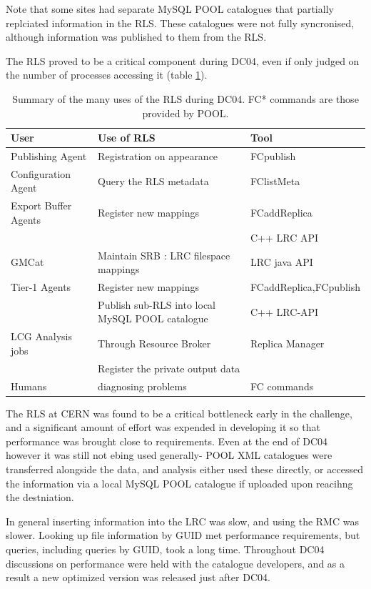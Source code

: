 \documentclass{cmspaper}
\begin{document}
Note that some sites had separate MySQL POOL catalogues that partially replciated information in the RLS. These catalogues were not fully syncronised, although information was published to them from the RLS.

The RLS proved to be a critical component during DC04, even if only judged on the number of processes accessing it (table \ref{table:rls}).

\begin{table}
\begin{tabular}[tbp]{|l|l|l|}
\hline User & Use of RLS & Tool
\\ \hline Publishing Agent & Registration on appearance & FCpublish
\\ Configuration Agent & Query the RLS metadata & FClistMeta
\\ Export Buffer Agents & Register new mappings & FCaddReplica
\\ & & C++ LRC API
\\ GMCat & Maintain SRB : LRC filespace mappings & LRC java API
\\ Tier-1 Agents & Register new mappings & FCaddReplica,FCpublish
\\ & Publish sub-RLS into local MySQL POOL catalogue & C++ LRC-API
\\ LCG Analysis jobs & Through Resource Broker & Replica Manager
\\ & Register the private output data & 
\\ Humans & diagnosing problems & FC commands
\\ \hline
\end{tabular}
\label{table:rls}
\caption{Summary of the many uses of the RLS during DC04. FC* commands are those provided by POOL.}
\end{table}

The RLS at CERN was found to be a critical bottleneck early in the challenge, and a significant amount of effort was expended in developing it so that performance was brought close to requirements. Even at the end of DC04 however it was still not ebing used generally- POOL XML catalogues were transferred alongside the data, and analysis either used these directly, or accessed the information via a local MySQL POOL catalogue if uploaded upon reacihng the destniation.

In general inserting information into the LRC was slow, and using the RMC was slower. Looking up file information by GUID met performance requirements, but queries, including queries by GUID, took a long time. Throughout DC04 discussions on performance were held with the catalogue developers, and as a result a new optimized version was released just after DC04.
\end{document}
